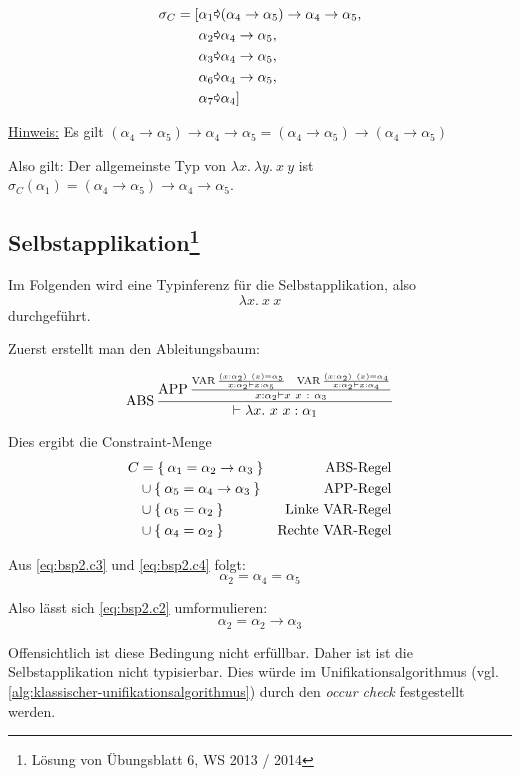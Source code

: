 \begin{align*}
	\sigma_C = [&\alpha_1 \Parr (\alpha_4 \rightarrow \alpha_5) \rightarrow \alpha_4 \rightarrow \alpha_5,\\
	&\alpha_2 \Parr \alpha_4 \rightarrow \alpha_5,\\
	&\alpha_3 \Parr \alpha_4 \rightarrow \alpha_5,\\
	&\alpha_6 \Parr \alpha_4 \rightarrow \alpha_5,\\
	&\alpha_7 \Parr \alpha_4]
\end{align*}

\underline{Hinweis:} Es gilt $(\alpha_4 \rightarrow \alpha_5) \rightarrow \alpha_4 \rightarrow \alpha_5 = (\alpha_4 \rightarrow \alpha_5) \rightarrow (\alpha_4 \rightarrow \alpha_5)$

Also gilt: Der allgemeinste Typ von $\lambda x.\ \lambda y.\ x\ y$ ist $\sigma_C (\alpha_1) = (\alpha_4 \rightarrow \alpha_5) \rightarrow \alpha_4 \rightarrow \alpha_5$.

\subsection[Selbstapplikation]{Selbstapplikation\footnote{Lösung von Übungsblatt 6, WS 2013 / 2014}}
Im Folgenden wird eine Typinferenz für die Selbstapplikation, also
\[\lambda x.\ x\ x\]
durchgeführt.

Zuerst erstellt man den Ableitungsbaum:

\[\ABS\frac{\APP \frac{\VAR \frac{(x:\alpha_2)\ (x) = \alpha_5}{x:\alpha_2 \vdash x: \alpha_5} \;\;\; \VAR \frac{(x:\alpha_2)\ (x) = \alpha_4}{x:\alpha_2 \vdash x:\alpha_4}}{x: \alpha_2 \vdash x\ x\ :\ \alpha_3}}{\vdash \lambda x.\ x\ x: \alpha_1}\]

Dies ergibt die Constraint-Menge
\begin{align}
	C&= \Set{\alpha_1 = \alpha_2 \rightarrow \alpha_3}    &\text{$\operatorname{ABS}$-Regel}\label{eq:bsp2.c1}\\ 
     &\cup \Set{\alpha_5 = \alpha_4 \rightarrow \alpha_3} &\text{$\operatorname{APP}$-Regel}\label{eq:bsp2.c2}\\
     &\cup \Set{\alpha_5 = \alpha_2}                      &\text{Linke $\operatorname{VAR}$-Regel}\label{eq:bsp2.c3}\\
     &\cup \Set{\alpha_4 = \alpha_2}                      &\text{Rechte $\operatorname{VAR}$-Regel}\label{eq:bsp2.c4}
\end{align}

Aus \cref{eq:bsp2.c3} und \cref{eq:bsp2.c4} folgt:
\[\alpha_2 = \alpha_4 = \alpha_5\]

Also lässt sich \cref{eq:bsp2.c2} umformulieren:
\[\alpha_2 = \alpha_2 \rightarrow \alpha_3\]

Offensichtlich ist diese Bedingung nicht erfüllbar. Daher ist ist die Selbstapplikation
nicht typisierbar. Dies würde im Unifikationsalgorithmus 
(vgl. \cref{alg:klassischer-unifikationsalgorithmus})
durch den \textit{occur check} festgestellt werden.